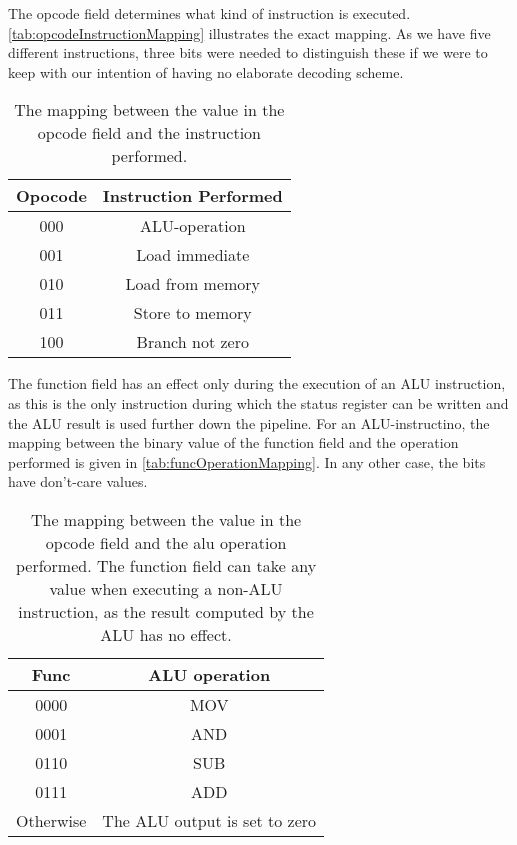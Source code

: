\documentclass[11pt]{article}
\begin{document}
The opcode field determines what kind of instruction is
executed. \autoref{tab:opcodeInstructionMapping} illustrates the exact
mapping. As we have five different instructions, three bits were
needed to distinguish these if we were to keep with our intention of
having no elaborate decoding scheme.

\begin{table}[htbp]
  \centering
  \begin{tabular}{|c|c|}
    \hline
    {\bf Opocode} & {\bf Instruction Performed} \\ \hline
    000 & ALU-operation \\ \hline
    001 & Load immediate \\ \hline
    010 & Load from memory \\ \hline
    011 & Store to memory \\ \hline
    100 & Branch not zero \\ \hline
  \end{tabular}
  \caption{The mapping between the value in the opcode field and the instruction performed.}
  \label{tab:opcodeInstructionMapping}
\end{table}

The function field has an effect only during the execution of an ALU
instruction, as this is the only instruction during which the status
register can be written and the ALU result is used further down the
pipeline. For an ALU-instructino, the mapping between the binary value
of the function field and the operation performed is given in
\autoref{tab:funcOperationMapping}. In any other case, the bits have
don't-care values.

\begin{table}[htbp]
  \centering
  \begin{tabular}{|c|c|}
    \hline
    {\bf Func} & {\bf ALU operation} \\ \hline
    0000 & MOV \\ \hline
    0001 & AND \\ \hline
    0110 & SUB \\ \hline
    0111 & ADD \\ \hline
    Otherwise & The ALU output is set to zero \\ \hline
  \end{tabular}
  \caption{The mapping between the value in the opcode field and the alu operation performed. The function field can take any value when executing a non-ALU instruction, as the result computed by the ALU has no effect.}
  \label{tab:funcOperationMapping}
\end{table}
\end{document}
